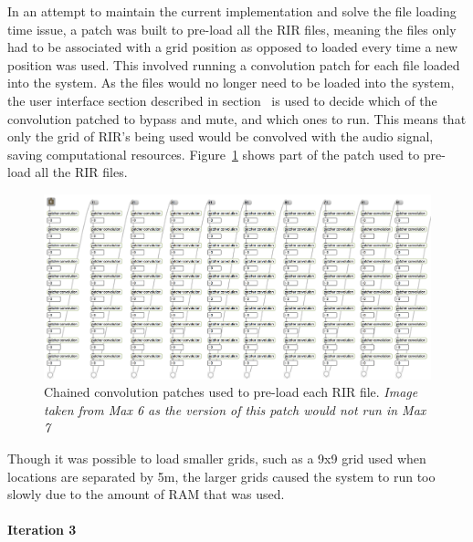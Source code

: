 \documentclass[../../main.tex]{subfiles}
\begin{document}
		 	In an attempt to maintain the current implementation and solve the file loading time issue, a patch was built to pre-load all the \ac{RIR} files, meaning the files only had to be associated with a grid position as opposed to loaded every time a new position was used. This involved running a convolution patch for each file loaded into the system. As the files would no longer need to be loaded into the system, the user interface section described in section~ is used to decide which of the convolution patched to bypass and mute, and which ones to run. This means that only the grid of \ac{RIR}'s being used would be convolved with the audio signal, saving computational resources. Figure~\ref{preload} shows part of the patch used to pre-load all the \ac{RIR} files.

			\begin{figure}[H]
				\centerline{\includegraphics[scale = 0.4]{Sections/Implementation/Max/images/Max/Iteration2/preload.png}}
				\caption{Chained convolution patches used to pre-load each \ac{RIR} file. \textit{Image taken from Max 6 as the version of this patch would not run in Max 7}}
				\label{preload}
			\end{figure}


			Though it was possible to load smaller grids, such as a 9x9 grid used when locations are separated by 5m, the larger grids caused the system to run too slowly due to the amount of RAM that was used.

		 \paragraph{Iteration 3}
		 \label{iteration3}
\end{document}
